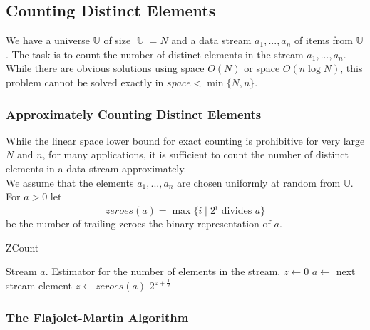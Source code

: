 \documentclass[english]{panikzettel}
\begin{document}
\subsection{Counting Distinct Elements}
We have a universe $\mathbb{U}$ of size $|\mathbb{U}|=N$ and a data stream $a_1,...,a_n$ of items from $\mathbb{U}$.
The task is to count the number of distinct elements in the stream $a_1,...,a_n$. While there are obvious solutions using space $O(N)$ or space $O(n\log N)$, this problem cannot be solved exactly in $space < \min\{N,n \}.$

\subsubsection{Approximately Counting Distinct Elements}

\begin{halfboxl}
\vspace{-\baselineskip}

While the linear space lower bound for exact counting is prohibitive for very large $N$ and $n$, for many applications, it is sufficient to count the number of distinct elements in a data stream approximately.\\
We assume that the elements $a_1,...,a_n$ are chosen uniformly at random from $\mathbb{U}$. For $a>0$ let
\[
zeroes(a)=\max \{i \mid 2^i \text{ divides } a \}
\]
be the number of trailing zeroes the binary representation of $a$.

\end{halfboxl}
\begin{halfboxr}
\vspace{-\baselineskip}

\begin{algo}{ZCount}
{
\renewcommand{\algorithmicrequire}{\textbf{Input:}}
\renewcommand{\algorithmicensure}{\textbf{Output:}}
  \begin{algorithmic}[1]
  \Require Stream $a$.
  \Ensure Estimator for the number of elements in the stream.
  \State $z\leftarrow 0$
  	\State $a\leftarrow$ next stream element
    \State $z\leftarrow zeroes(a)$
    \EndIf
  \EndWhile
  \State \Return $2^{z+\frac{1}{2}}$ %
  \end{algorithmic}
}
\end{algo}

\end{halfboxr}

\subsubsection{The Flajolet-Martin Algorithm}
\end{document}
